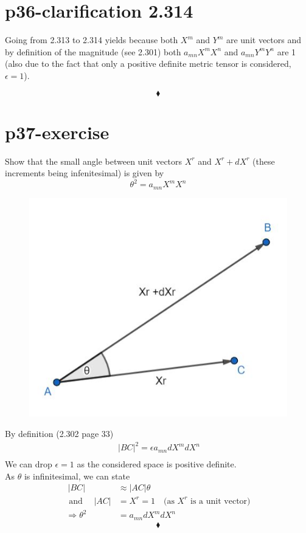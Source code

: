 \section{p36-clarification 2.314}
\begin{tcolorbox}
Going from 2.313 to 2.314 yields because both $X^m$ and $Y^m$ are unit vectors and by definition of the magnitude (see 2.301) both  $a_{mn}X^mX^n$ and $a_{mn}Y^mY^n$ are 1 (also due to the fact that only a positive definite metric tensor is considered, $\epsilon = 1$).
\end{tcolorbox}
$$\blacklozenge$$
\newpage

\section{p37-exercise}

\begin{tcolorbox}
Show that the small angle between unit vectors $X^r$ and $X^r + dX^r$ (these increments being infenitesimal) is given by $$ \theta^2 = a_{mn}X^mX^n$$
\end{tcolorbox}
\begin{figure}[htp] 
    \centering
\includegraphics[scale=.5]{Exp37_1.jpg}
\end{figure}
By definition (2.302 page 33)
\begin{align} 
\ |BC|^2 =\epsilon a_{mn}dX^mdX^n\\
\end{align}
We can drop $\epsilon = 1$ as the considered space is positive definite.\\
As $\theta$ is infinitesimal, we can state
\begin{align}
\ |BC| &\approx |AC|\theta\\
\text{ and } \quad |AC| &= X^r = 1\quad  \text{(as } X^r \text{ is a unit vector)}\\
\Rightarrow \theta^2 &= a_{mn}dX^mdX^n
\end{align}
$$\blacklozenge$$
\newpage


